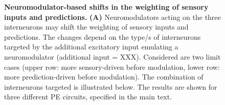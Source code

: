 \documentclass[10pt,a4paper]{article}
\begin{document}
\begin{figure}[t!]
	\centering
\caption{\footnotesize{\bf Neuromodulator-based shifts in the weighting of sensory inputs and predictions.
\newline} 
{\bf (A)} Neuromodulators acting on the three interneurons may shift the weighting of sensory inputs and predictions. The changes depend on the type/s of interneurons targeted by the additional excitatory input emulating a neuromodulator (additional input = XXX). Considered are two limit cases (upper row: more sensory-driven before modulation, lower row: more prediction-driven before modulation). The combination of interneurons targeted is illustrated below. The results are shown for three different PE circuits, specified in the main text. 
}
\end{figure}
\end{document}
